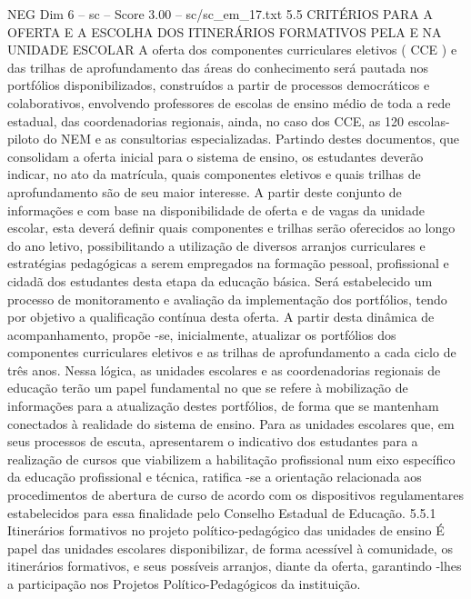\begin{textsample}{NEG Dim 6 – sc – Score 3.00 – sc/sc\_em\_17.txt}  \label{ex:f6_neg_279}
5.5 CRITÉRIOS PARA A OFERTA E A ESCOLHA DOS ITINERÁRIOS FORMATIVOS PELA E NA UNIDADE ESCOLAR A oferta dos componentes curriculares eletivos ( CCE ) e das trilhas de aprofundamento das áreas do conhecimento será pautada nos portfólios disponibilizados, construídos a partir de processos democráticos e colaborativos, envolvendo professores de escolas de ensino médio de toda a rede estadual, das coordenadorias regionais, ainda, no caso dos CCE, as 120 escolas-piloto do NEM e as consultorias especializadas.
Partindo destes documentos, que consolidam a oferta inicial para o sistema de ensino, os estudantes deverão indicar, no ato da matrícula, quais componentes eletivos e quais trilhas de aprofundamento são de seu maior interesse.
A partir deste conjunto de informações e com base na disponibilidade de oferta e de vagas da unidade escolar, esta deverá definir quais componentes e trilhas serão oferecidos ao longo do ano letivo, possibilitando a utilização de diversos arranjos curriculares e estratégias pedagógicas a serem empregados na formação pessoal, profissional e cidadã dos estudantes desta etapa da educação básica.
Será estabelecido um processo de monitoramento e avaliação da implementação dos portfólios, tendo por objetivo a qualificação contínua desta oferta.
A partir desta dinâmica de acompanhamento, propõe -se, inicialmente, atualizar os portfólios dos componentes curriculares eletivos e as trilhas de aprofundamento a cada ciclo de três anos.
Nessa lógica, as unidades escolares e as coordenadorias regionais de educação terão um papel fundamental no que se refere à mobilização de informações para a atualização destes portfólios, de forma que se mantenham conectados à realidade do sistema de ensino.
Para as unidades escolares que, em seus processos de escuta, apresentarem o indicativo dos estudantes para a realização de cursos que viabilizem a habilitação profissional num eixo específico da educação profissional e técnica, ratifica -se a orientação relacionada aos procedimentos de abertura de curso de acordo com os dispositivos regulamentares estabelecidos para essa finalidade pelo Conselho Estadual de Educação. 5.5.1 Itinerários formativos no projeto político-pedagógico das unidades de ensino É papel das unidades escolares disponibilizar, de forma acessível à comunidade, os itinerários formativos, e seus possíveis arranjos, diante da oferta, garantindo -lhes a participação nos Projetos Político-Pedagógicos da instituição.

\end{textsample}
